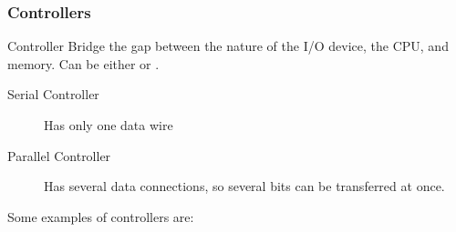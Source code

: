 \documentclass[\main/notes.tex]{subfiles}
\begin{document}
				\subsubsection{Controllers}
					\begin{definition}{Controller}
						Bridge the gap between the nature of the I/O device, the CPU, and memory. Can be either  or .
						\begin{indentparagraph}
							\begin{description}
								\item[Serial Controller] Has only one data wire
								\item[Parallel Controller] Has several data connections, so several bits can be transferred at once.
							\end{description}
						\end{indentparagraph}
					\end{definition}
					Some examples of controllers are:
\end{document}
